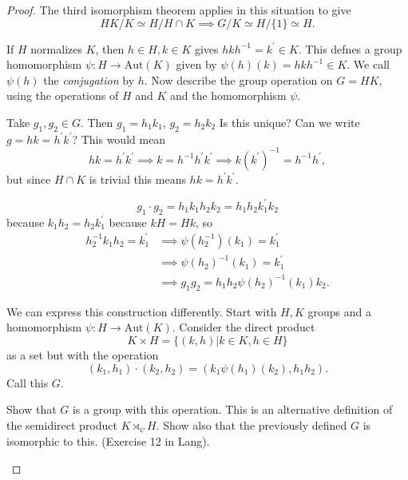 \begin{proof}
The third isomorphism theorem applies in this situation to give
$$
HK / K \simeq H / H \cap K \implies
G / K  \simeq H / \{ 1 \} \simeq H.
$$

If $H$ normalizes $K$, then
$h \in H, k \in K$ gives $h k h^{-1} = k^\prime \in K$. This defnes a
group homomorphism $\psi : H \to \mathrm{Aut}(K)$ given by
$\psi(h)(k) = h k h^{-1} \in K$. We call $\psi(h)$ the
\emph{conjugation} by $h$. Now describe the group operation on
$G = HK$, using the operations of $H$ and $K$ and the homomorphism $\psi$.

Take $g_1, g_2 \in G$. Then $g_1 = h_1 k_1$, $g_2 = h_2 k_2$ Is this
unique? Can we write $g = hk = h^\prime k^\prime$? This would mean
$$
hk = h^\prime k^\prime
  \implies k = h^{-1} h^\prime k^\prime
  \implies k (k^\prime)^{-1} = h^{-1} h^\prime,
$$
but since $H \cap K$ is trivial this means
$hk = h^\prime k^\prime$.

$$g_1 \cdot g_2 = h_1 k_1 h_2 k_2 = h_1 h_2 k_1^\prime k_2$$
because $k_1 h_2 = h_2 k_1^\prime$ because $kH = Hk$, so
\begin{align*}
h_2^{-1} k_1 h_2 = k_1^\prime
& \implies
  \psi(h_2^{-1})(k_1) = k_1^\prime \\
& \implies
  \psi(h_2)^{-1}(k_1) = k_1^\prime \\
& \implies g_1 g_2 = h_1 h_2 \psi(h_2)^{-1} (k_1) k_2.
\end{align*}


We can express this construction differently. Start with
$H, K$ groups and a homomorphism $\psi : H \to \mathrm{Aut}(K)$.
Consider the direct product
$$
K \times H = \{(k, h) | k \in K, h \in H \}
$$
as a set but with the operation
$$
(k_1, h_1) \cdot (k_2, h_2) = (k_1 \psi(h_1)(k_2), h_1 h_2).
$$
Call this $G$.

\begin{exer}
Show that $G$ is a group with this operation. This is an alternative
definition of the semidirect product $K \rtimes_\psi H$. Show also
that the previously defined $G$ is isomorphic to this. (Exercise 12 in Lang).
\end{exer}


\end{proof}
